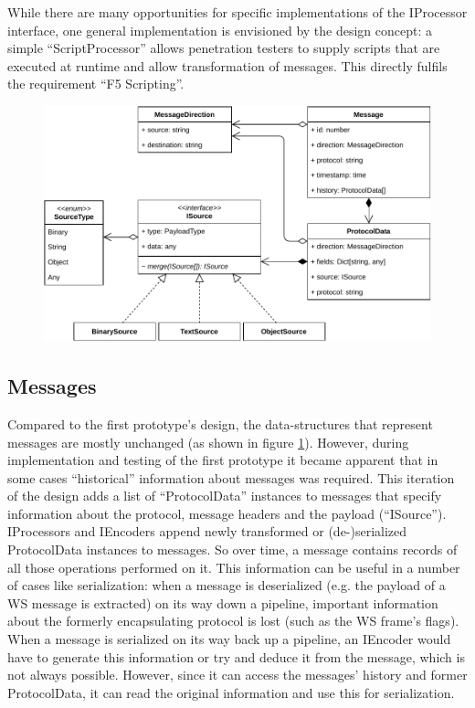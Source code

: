 While there are many opportunities for specific implementations of the IProcessor interface, one general implementation is envisioned by the design concept: a simple \enquote{ScriptProcessor} allows penetration testers to supply scripts that are executed at runtime and allow transformation of messages. This directly fulfils the requirement \enquote{F5 Scripting}.
\begin{figure}[h]
    \centering
    \includegraphics[width=14cm]{img/ch05/classes-4-messages.pdf}
    \label{fig:classes-4-messages}
\end{figure} %
\subsection{Messages}
Compared to the first prototype's design, the data-structures that represent messages are mostly unchanged (as shown in figure \ref{fig:classes-4-messages}). However, during implementation and testing of the first prototype it became apparent that in some cases \enquote{historical} information about messages was required. This iteration of the design adds a list of \enquote{ProtocolData} instances to messages that specify information about the protocol, message headers and the payload (\enquote{ISource}). IProcessors and IEncoders append newly transformed or (de-)serialized ProtocolData instances to messages. So over time, a message contains records of all those operations performed on it. This information can be useful in a number of cases like serialization: when a message is deserialized (e.g. the payload of a \ac{WS} message is extracted) on its way down a pipeline, important information about the formerly encapsulating protocol is lost (such as the \ac{WS} frame's flags). When a message is serialized on its way back up a pipeline, an IEncoder would have to generate this information or try and deduce it from the message, which is not always possible. However, since it can access the messages' history and former ProtocolData, it can read the original information and use this for serialization.

